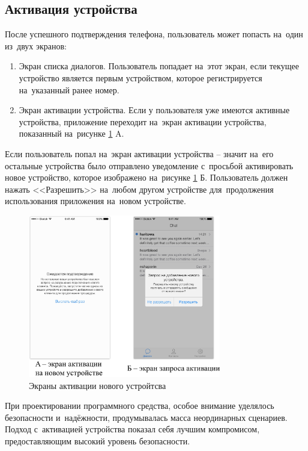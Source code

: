 \subsection{Активация устройства}
\label{sec:usage:deviceactivation}

После успешного подтверждения телефона, пользователь может попасть на~один из~двух экранов:

\begin{enumerate}
	\item Экран списка диалогов. Пользователь попадает на~этот экран, если текущее устройство является первым устройством, которое регистрируется на~указанный ранее номер.
	\item Экран активации устройства. Если у пользователя уже имеются активные устройства, приложение переходит на~экран активации устройства, показанный на~рисунке \ref{sec:usage:deviceactivation:ui} A.
\end{enumerate}

Если пользователь попал на~экран активации устройства -- значит на~его остальные устройства было отправлено уведомление с~просьбой активировать новое устройство, которое изображено на~рисунке \ref{sec:usage:deviceactivation:ui} Б. Пользователь должен нажать <<Разрешить>> на~любом другом устройстве для~продолжения использования приложения на~новом устройстве.

\begin{figure}[h]
  \centering
    \includegraphics[width=0.75\textwidth]{inc/img/ui/ui_approve.jpg}
  \caption{Экраны активации нового устройтсва}
  \label{sec:usage:deviceactivation:ui}
\end{figure}

При проектировании программного средства, особое внимание уделялось безопасности и~надёжности, продумывалась масса неординарных сценариев. Подход с~активацией устройства показал себя лучшим компромисом, предоставляющим высокий уровень безопасности.